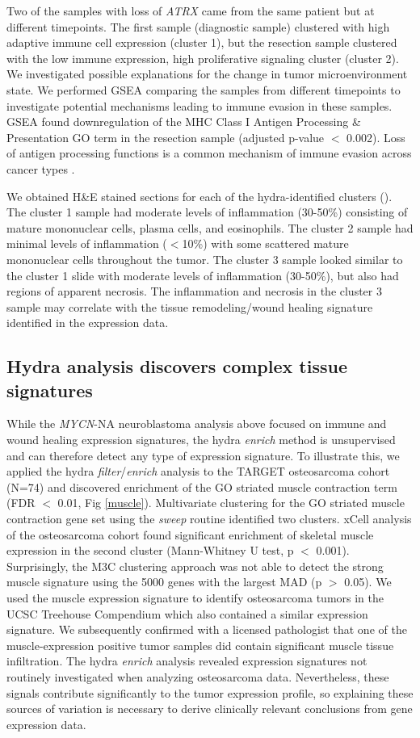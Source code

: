 \documentclass[10pt,letterpaper]{article}
\begin{document}
Two of the samples with loss of \textit{ATRX} came from the same patient but at different timepoints. The first sample (diagnostic sample) clustered with high adaptive immune cell expression (cluster 1), but the resection sample clustered with the low immune expression, high proliferative signaling cluster (cluster 2). We investigated possible explanations for the change in tumor microenvironment state. We performed GSEA comparing the samples from different timepoints to investigate potential mechanisms leading to immune evasion in these samples. GSEA found downregulation of the MHC Class I Antigen Processing \& Presentation GO term in the resection sample (adjusted p-value $<$ 0.002). Loss of antigen processing functions is a common mechanism of immune evasion across cancer types \cite{reevesAntigenProcessingImmune2017}. 

We obtained H\&E stained sections for each of the hydra-identified clusters (). The cluster 1 sample had moderate levels of inflammation (30-50\%) consisting of mature mononuclear cells, plasma cells, and eosinophils. The cluster 2 sample had minimal levels of inflammation ($<$10\%) with some scattered mature mononuclear cells throughout the tumor. The cluster 3 sample looked similar to the cluster 1 slide with moderate levels of inflammation (30-50\%), but also had regions of apparent necrosis. The inflammation and necrosis in the cluster 3 sample may correlate with the tissue remodeling/wound healing signature identified in the expression data.

\subsection*{Hydra analysis discovers complex tissue signatures}
While the \textit{MYCN}-NA neuroblastoma analysis above focused on immune and wound healing expression signatures, the hydra \textit{enrich} method is unsupervised and can therefore detect any type of expression signature. To illustrate this, we applied the hydra \textit{filter}/\textit{enrich} analysis to the TARGET osteosarcoma cohort (N=74) and discovered enrichment of the GO striated muscle contraction term (FDR $<$ 0.01, Fig \ref{muscle}). Multivariate clustering for the GO striated muscle contraction gene set using the \textit{sweep} routine identified two clusters. xCell analysis of the osteosarcoma cohort found significant enrichment of skeletal muscle expression in the second cluster (Mann-Whitney U test, p $<$ 0.001). Surprisingly, the M3C clustering approach was not able to detect the strong muscle signature using the 5000 genes with the largest MAD (p $>$ 0.05). We used the muscle expression signature to identify osteosarcoma tumors in the UCSC Treehouse Compendium which also contained a similar expression signature. We subsequently confirmed with a licensed pathologist that one of the muscle-expression positive tumor samples did contain significant muscle tissue infiltration. The hydra \textit{enrich} analysis revealed expression signatures not routinely investigated when analyzing osteosarcoma data. Nevertheless, these signals contribute significantly to the tumor expression profile, so explaining these sources of variation is necessary to derive clinically relevant conclusions from gene expression data.
\end{document}
